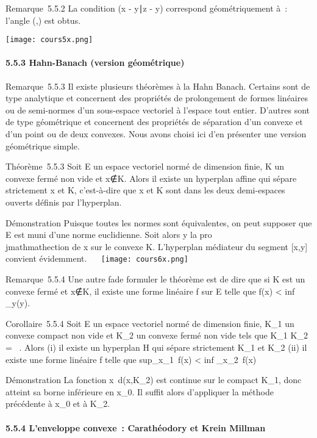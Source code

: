 \documentclass[]{article}
\begin{document}
Remarque~5.5.2 La condition (x - y∣z - y) 
correspond géométriquement à~: l'angle
(\overrightarrowyx,\overrightarrowyz)
est obtus.

\texttt{[image: cours5x.png]}

\paragraph{5.5.3 Hahn-Banach (version géométrique)}

Remarque~5.5.3 Il existe plusieurs théorèmes à la Hahn Banach. Certains
sont de type analytique et concernent des propriétés de prolongement de
formes linéaires ou de semi-normes d'un sous-espace vectoriel à l'espace
tout entier. D'autres sont de type géométrique et concernent des
propriétés de séparation d'un convexe et d'un point ou de deux convexes.
Nous avons choisi ici d'en présenter une version géométrique simple.

Théorème~5.5.3 Soit E un espace vectoriel normé de dimension finie, K un
convexe fermé non vide et x∉K. Alors il
existe un hyperplan affine qui sépare strictement x et K, c'est-à-dire
que x et K sont dans les deux demi-espaces ouverts définis par
l'hyperplan.

Démonstration Puisque toutes les normes sont équivalentes, on peut
supposer que E est muni d'une norme euclidienne. Soit alors y la
pro\\jmathmathection de x sur le convexe K. L'hyperplan médiateur du segment
{[}x,y{]} convient évidemment. ~~ \texttt{[image: cours6x.png]}

Remarque~5.5.4 Une autre fa\ccon de formuler le
théorème est de dire que si K est un convexe fermé et
x∉K, il existe une forme linéaire f sur E
telle que f(x) \textless{} inf~
_y\inKf(y).

Corollaire~5.5.4 Soit E un espace vectoriel normé de dimension finie,
K_1 un convexe compact non vide et K_2 un convexe
fermé non vide tels que K_1 \bigcap K_2 = \varnothing~. Alors (i) il
existe un hyperplan H qui sépare strictement K_1 et
K_2 (ii) il existe une forme linéaire f telle que
sup_x\inK_1~f(x)
\textless{} inf _x\inK_2~f(x)

Démonstration La fonction x\mapsto~d(x,K_2)
est continue sur le compact K_1, donc atteint sa borne
inférieure en x_0. Il suffit alors d'appliquer la méthode
précédente à x_0 et à K_2.

\paragraph{5.5.4 L'enveloppe convexe~: Carathéodory et Krein Millman}
\end{document}
